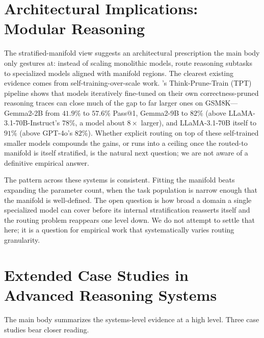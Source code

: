 


\appendix

\section{Architectural Implications: Modular Reasoning}
\label{app:arch}

The stratified-manifold view suggests an architectural prescription the main body only gestures at: instead of scaling monolithic models, route reasoning subtasks to specialized models aligned with manifold regions. The clearest existing evidence comes from self-training-over-scale work. \citet{costello2025think}'s Think-Prune-Train (TPT) pipeline shows that models iteratively fine-tuned on their own correctness-pruned reasoning traces can close much of the gap to far larger ones on GSM8K---Gemma2-2B from $41.9\%$ to $57.6\%$ Pass@1, Gemma2-9B to $82\%$ (above LLaMA-3.1-70B-Instruct's $78\%$, a model about $8\times$ larger), and LLaMA-3.1-70B itself to $91\%$ (above GPT-4o's $82\%$). Whether explicit routing on top of these self-trained smaller models compounds the gains, or runs into a ceiling once the routed-to manifold is itself stratified, is the natural next question; we are not aware of a definitive empirical answer.

The pattern across these systems is consistent. Fitting the manifold beats expanding the parameter count, when the task population is narrow enough that the manifold is well-defined. The open question is how broad a domain a single specialized model can cover before its internal stratification reasserts itself and the routing problem reappears one level down. We do not attempt to settle that here; it is a question for empirical work that systematically varies routing granularity.

\section{Extended Case Studies in Advanced Reasoning Systems}
\label{app:systems}

The main body summarizes the systems-level evidence at a high level. Three case studies bear closer reading.

